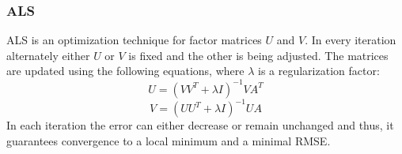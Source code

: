 \subsubsection{\ac{ALS}}

\ac{ALS} is an optimization technique for factor matrices $U$ and $V$. In every iteration alternately either $U$ or $V$ is fixed and the other is being adjusted. The matrices are updated using the following equations, where $\lambda$ is a regularization factor:
\begin{equation}
    U = (VV^T + \lambda I)^{-1}VA^T
\end{equation}
\begin{equation}
    V = (UU^T + \lambda I)^{-1}UA
\end{equation}
In each iteration the error can either decrease or remain unchanged and thus, it guarantees convergence to a local minimum and a minimal \ac{RMSE}.
